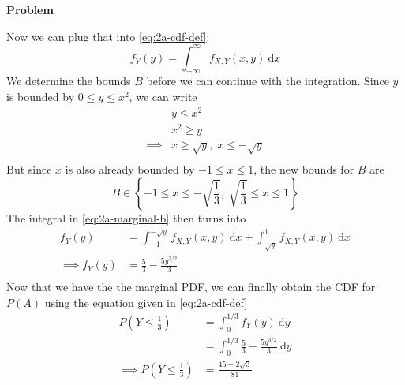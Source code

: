 \documentclass[12pt]{article}
\newenvironment{Ex}{\textbf{Problem}\vspace{.75em}\\}{}
\newcommand{\dd}[1]{\:\mathrm{d}{#1}}
\begin{document}
\begin{enumerate}
\begin{Ex}
\begin{solution}
\begin{enumerate}
        Now we can plug that into \cref{eq:2a-cdf-def}:
        \begin{equation}
          \label{eq:2a-marginal-b}
          f_Y(y) = \int_{-\infty}^{\infty} f_{X,Y}(x,y) \dd{x}
        \end{equation}
        We determine the bounds $B$ before we can continue with the
        integration. Since $y$ is bounded by $0\le y \le x^2$, we can
        write
        \begin{equation}
          \label{eq:2a-y-bounds}
          \begin{aligned}
            & y \le x^2 \\
            & x^2 \ge y \\
            \implies & x \ge \sqrt{y},\; x \le -\sqrt{y} \\
          \end{aligned}
        \end{equation}
        But since $x$ is also already bounded by $-1 \le x \le 1$, the
        new bounds for $B$ are
        \begin{equation}
          \label{eq:2a-new-y-bounds}
          B \in \left\{-1\le x\le-\sqrt{\frac{1}{3}},\;
          \sqrt{\frac{1}{3}}\le x\le1\right\}
        \end{equation}
        The integral in \cref{eq:2a-marginal-b} then turns into
        \begin{equation}
          \label{eq:2a-marginal}
          \begin{aligned}
            f_Y(y) &= \int_{-1}^{-\sqrt{y}} f_{X,Y}(x,y)
              \dd{x} + \int_{\sqrt{y}}^{1} f_{X,Y}(x,y)
              \dd{x}\\
            \implies f_Y(y) &= \frac{5}{3}-\frac{5y^{3/2}}{3} \\
          \end{aligned}
        \end{equation}
        Now that we have the the marginal PDF, we can finally obtain
        the CDF for $P(A)$ using the equation given in \cref{eq:2a-cdf-def}
        \begin{equation}
          \label{eq:2a-cdf-plugged}
          \begin{aligned}
            P\left(Y \le \frac{1}{3}\right) &= \int_{0}^{1/3}
            f_{Y}(y) \dd{y} \\
             &= \int_{0}^{1/3} \frac{5}{3}-\frac{5y^{3/2}}{3}
             \dd{y} \\
            \implies P\left(Y \le \frac{1}{3}\right) &=
            \frac{45-2\sqrt{3}}{81} \\

\end{aligned}
\end{equation}
\end{enumerate}
\end{solution}
\end{Ex}
\end{enumerate}
\end{document}
